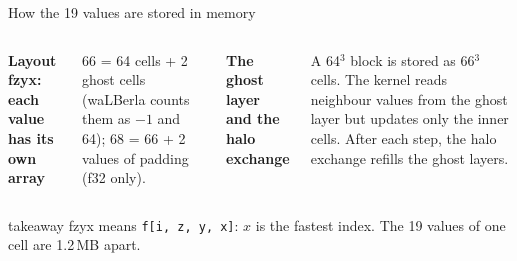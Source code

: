 \documentclass[aspectratio=169,10pt,t]{beamer}
\newcommand{\term}[1]{\textcolor{psblue!85!black}{\textbf{#1}}} %
\newcommand{\code}[1]{\texttt{#1}}
\newcommand{\takeaway}[1]{\par\vfill
  \begin{beamercolorbox}[wd=\textwidth,sep=4pt,rounded=true]{takeaway}
    \small #1
  \end{beamercolorbox}}
\begin{document}
\begin{frame}{How the 19 values are stored in memory}
  \vspace{0mm}
  \begin{columns}[T,onlytextwidth]
    {\small\bfseries Layout \term{fzyx}: each value has its own array\par}
    \vspace{1mm}
    \par
    {\tiny\color{psgray}66 = 64 cells + 2 ghost cells (waLBerla counts them as $-1$ and 64); 68 = 66 + 2 values of
    padding (f32 only).\par}
    \vspace{0.5mm}
    
    {\small\bfseries The \term{ghost layer} and the \term{halo exchange}\par}
    \vspace{2mm}
    \centering

    \vspace{1mm}
    \raggedright
    {\scriptsize A 64$^3$ block is stored as 66$^3$ cells. The kernel reads neighbour values from the ghost layer
    but updates only the inner cells. After each step, the halo exchange refills the ghost layers.\par}
  \end{columns}
  \takeaway{fzyx means \code{f[i, z, y, x]}: $x$ is the fastest index. The 19 values of one cell are 1.2\,MB apart.}
\end{frame}



\end{document}
